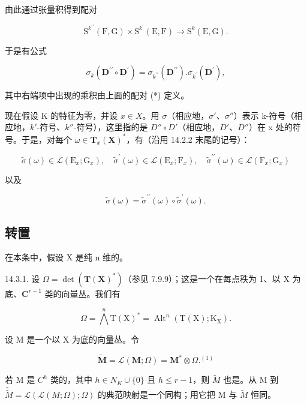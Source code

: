 由此通过张量积得到配对

\[
\mathrm{S} ^ {k ^ {\prime \prime}} (\mathrm{F}, \mathrm{G}) \times \mathrm{S} ^ {k ^ {\prime}} (\mathrm{E}, \mathrm{F}) \rightarrow \mathrm{S} ^ {k} (\mathrm{E}, \mathrm{G}).\tag{*}
\]

于是有公式

\[
\sigma_ {k} (\mathbf {D} ^ {\prime \prime} \circ \mathbf {D} ^ {\prime}) = \sigma_ {k ^ {\prime \prime}} (\mathbf {D} ^ {\prime \prime}). \sigma_ {k ^ {\prime}} (\mathbf {D} ^ {\prime}),
\]

其中右端项中出现的乘积由上面的配对 (*) 定义。

现在假设 K 的特征为零，并设 \(x \in X\)。用 \(\sigma\)（相应地，\(\sigma'\)、\(\sigma''\)）表示 k-符号（相应地，\(k'\)-符号、\(k''\)-符号），这里指的是 \(D'' \circ D'\)（相应地，\(D'\)、\(D''\)）在 x 处的符号。于是，对每个 \(\omega \in \mathbf{T}_{x}(\mathbf{X})^{*}\)，有（沿用 14.2.2 末尾的记号）：

\[
\tilde {\sigma} (\omega) \in \mathscr {L} (\mathrm{E} _ {x}; \mathrm{G} _ {x}), \quad \tilde {\sigma} ^ {\prime} (\omega) \in \mathscr {L} (\mathrm{E} _ {x}; \mathrm{F} _ {x}), \quad \tilde {\sigma} ^ {\prime \prime} (\omega) \in \mathscr {L} (\mathrm{F} _ {x}; \mathrm{G} _ {x})
\]

以及

\[
\tilde {\sigma} (\omega) = \tilde {\sigma} ^ {\prime \prime} (\omega) \circ \tilde {\sigma} ^ {\prime} (\omega).
\]

\subsection{转置}

在本条中，假设 X 是纯 n 维的。

14.3.1. 设 \(\Omega = \det(\mathbf{T}(\mathbf{X})^{*})\)（参见 7.9.9）；这是一个在每点秩为 1、以 X 为底、\(\mathbf{C}^{r-1}\) 类的向量丛。我们有

\[
\Omega = \bigwedge^ {n} \mathrm{T} (\mathrm{X}) ^ {*} = \operatorname{Alt} ^ {n} (\mathrm{T} (\mathrm{X}); \mathrm{K} _ {\mathrm{X}}).
\]

设 M 是一个以 X 为底的向量丛。令

\[
\tilde {\mathbf {M}} = \mathcal {L} (\mathbf {M}; \Omega) = \mathbf {M} ^ {*} \otimes \Omega . ^ {(1)}
\]

若 M 是 \(C^{h}\) 类的，其中 \(h \in N_{K} \cup \{0\}\) 且 \(h \leqslant r - 1\)，则 \(\tilde{M}\) 也是。从 M 到 \(\tilde{\tilde{M}} = \mathcal{L}(\mathcal{L}(M; \Omega); \Omega)\) 的典范映射是一个同构；用它把 M 与 \(\tilde{M}\) 恒同。

